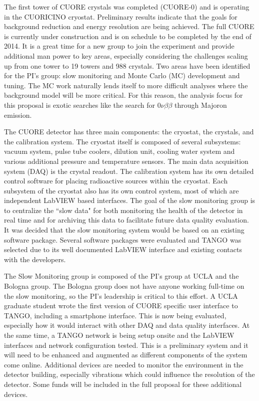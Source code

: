 \documentclass[11pt]{article}
\begin{document}
The first tower of CUORE crystals was completed (CUORE-0)  and is operating in the CUORICINO cryostat. Preliminary results indicate that the goals for background reduction and energy resolution are being achieved. The full CUORE is currently under construction and is on schedule to be completed by the end of 2014. It is a great time for a new group to join the experiment and provide additional man power to key areas, especially considering the challenges scaling up from one tower to 19 towers and 988 crystals. Two areas have been identified for the PI's group: slow monitoring and Monte Carlo (MC) development and tuning. The MC work naturally lends itself to more difficult analyses where the background model will be more critical. For this reason, the analysis focus for this proposal is exotic  searches like the search for $0\nu\beta\beta$ through Majoron emission.

The CUORE detector has three main components: the cryostat, the crystals, and the calibration system. The cryostat itself is composed of several subsystems: vacuum system, pulse tube coolers, dilution unit, cooling water system and various additional pressure and temperature sensors. The main data acquisition system (DAQ) is the crystal readout.  The calibration system has its own detailed control software for placing radioactive sources within the cryostat. Each subsystem of the cryostat also has its own control system, most of which are independent LabVIEW based interfaces.  The goal of the slow monitoring group is to centralize the ``slow data" for both monitoring the health of the detector in real time and for archiving this data to facilitate future data quality evaluation. It was decided that the slow monitoring system would be based on an existing software package. Several software packages were evaluated and TANGO\cite{tango} was selected due to its well documented LabVIEW interface and existing contacts with the developers.


The Slow Monitoring group is composed of the PI's group at UCLA and the Bologna group. The Bologna group does not have anyone working full-time on the slow monitoring, so the PI's leadership is critical to this effort. A UCLA graduate student wrote the first version of CUORE specific user interface to TANGO, including a smartphone interface. This is now being evaluated, especially how it would interact with other DAQ and data quality interfaces. At the same time, a TANGO network is being setup onsite and the LabVIEW interfaces and network configuration tested.  This is a preliminary system and it will need to be enhanced and augmented as different components of the system come online. Additional devices are needed to monitor the environment in the detector building, especially vibrations which could influence the resolution of the detector\cite{vignati}. Some funds will be included in the full proposal for these additional devices.
\end{document}
